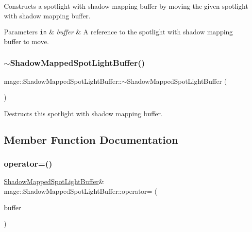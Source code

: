 Constructs a spotlight with shadow mapping buffer by moving the given spotlight with shadow mapping buffer.


\begin{DoxyParams}[1]{Parameters}
\mbox{\tt in}  & {\em buffer} & A reference to the spotlight with shadow mapping buffer to move. \\
\hline
\end{DoxyParams}
\hypertarget{structmage_1_1_shadow_mapped_spot_light_buffer_a2f403876460633aa03f1ad42d0eca653}{}\label{structmage_1_1_shadow_mapped_spot_light_buffer_a2f403876460633aa03f1ad42d0eca653} 
\subsubsection{\texorpdfstring{$\sim$\+Shadow\+Mapped\+Spot\+Light\+Buffer()}{~ShadowMappedSpotLightBuffer()}}
{\footnotesize\ttfamily mage\+::\+Shadow\+Mapped\+Spot\+Light\+Buffer\+::$\sim$\+Shadow\+Mapped\+Spot\+Light\+Buffer (\begin{DoxyParamCaption}{ }\end{DoxyParamCaption})\hspace{0.3cm}{\ttfamily [default]}}

Destructs this spotlight with shadow mapping buffer. 

\subsection{Member Function Documentation}
\hypertarget{structmage_1_1_shadow_mapped_spot_light_buffer_a80cd7b7d4c148c362e09cbf6c55dc045}{}\label{structmage_1_1_shadow_mapped_spot_light_buffer_a80cd7b7d4c148c362e09cbf6c55dc045} 
\subsubsection{\texorpdfstring{operator=()}{operator=()}\hspace{0.1cm}{\footnotesize\ttfamily [1/2]}}
{\footnotesize\ttfamily \hyperlink{structmage_1_1_shadow_mapped_spot_light_buffer}{Shadow\+Mapped\+Spot\+Light\+Buffer}\& mage\+::\+Shadow\+Mapped\+Spot\+Light\+Buffer\+::operator= (\begin{DoxyParamCaption}\item[{const \hyperlink{structmage_1_1_shadow_mapped_spot_light_buffer}{Shadow\+Mapped\+Spot\+Light\+Buffer} \&}]{buffer }\end{DoxyParamCaption})\hspace{0.3cm}{\ttfamily [default]}}

